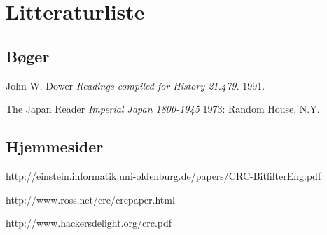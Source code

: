 \section{Litteraturliste}
\begingroup
\renewcommand{\section}[2]{}%

\begin{thebibliography}{1}
	\subsection{Bøger}
   John W. Dower {\em Readings compiled for History
  21.479.}  1991. %

    The Japan Reader {\em Imperial Japan 1800-1945} 1973:
  Random House, N.Y. %
  
	\subsection{Hjemmesider}
   {http://einstein.informatik.uni-oldenburg.de/papers/CRC-BitfilterEng.pdf}

   {http://www.ross.net/crc/crcpaper.html}
  
   {http://www.hackersdelight.org/crc.pdf}

  \end{thebibliography}